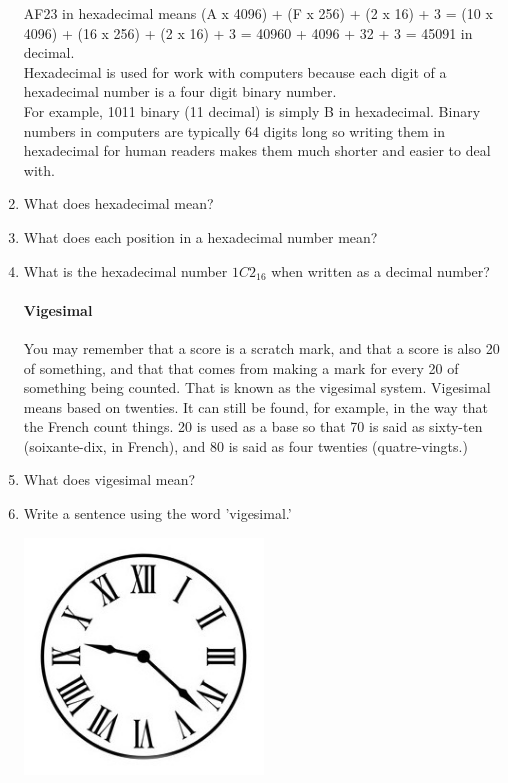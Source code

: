 \documentclass[12pt]{article}
\begin{document}
\begin{enumerate}
AF23 in hexadecimal means	(A x 4096) + (F x 256) + (2 x 16) + 3
= (10 x 4096) + (16 x 256) + (2 x 16) + 3
= 40960 + 4096 + 32 + 3
= 45091 in decimal.\\

Hexadecimal is used for work with computers because each digit of a hexadecimal number is a four digit binary number.\\

For example, 1011 binary (11 decimal) is simply B in hexadecimal. Binary numbers in computers are typically 64 digits long so writing them in hexadecimal for human readers makes them much shorter and easier to deal with.\\

\item What does hexadecimal mean?
\item What does each position in a hexadecimal  number mean?
\item What is the hexadecimal number $1C2_16$ when written as a decimal number?

\paragraph{Vigesimal}

You may remember that a score is a scratch mark, and that a score is also 20 of something, and that that comes from making a mark for every 20 of something being counted. That is known as the vigesimal system. Vigesimal means based on twenties. It can still be found, for example, in the way that the French count things. 20 is used as a base so that 70 is said as sixty-ten (soixante-dix, in French), and 80 is said as four twenties (quatre-vingts.)

\item What does vigesimal mean?
\item Write a sentence using the word 'vigesimal.'

\begin{center}
\includegraphics[width=0.5\textwidth]{old-fashion-vintage-clock-face}
\end{center}


\end{enumerate}
\end{document}
